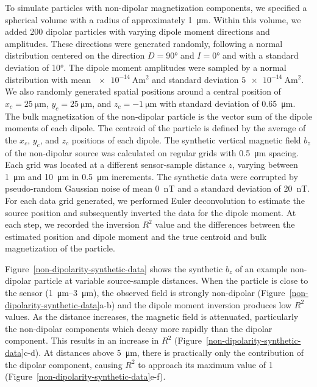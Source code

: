 To simulate particles with non-dipolar magnetization components, we specified a spherical volume with a radius of approximately \qty{1}{\um}. 
Within this volume, we added 200 dipolar particles with varying dipole moment directions and amplitudes. 
These directions were generated randomly, following a normal distribution centered on the direction $D=\ang{90}$ and $I=\ang{0}$ and with a standard deviation of \ang{10}.
The dipole moment amplitudes were sampled by a normal distribution with mean $\qty{e-14}{\ampere\m\squared}$ and standard deviation $\qty{5e-14}{\ampere\m\squared}$. 
We also randomly generated spatial positions around a central position of $x_c=\qty{25}{\um}$, $y_c=\qty{25}{\um}$, and $z_c=\qty{-1}{\um}$ with standard deviation of \qty{0.65}{\um}.
The bulk magnetization of the non-dipolar particle is the vector sum of the dipole moments of each dipole. 
The centroid of the particle is defined by the average of the $x_c$, $y_c$, and $z_c$ positions of each dipole.
The synthetic vertical magnetic field $b_z$ of the non-dipolar source was calculated on regular grids with \qty{0.5}{\um} spacing.
Each grid was located at a different sensor-sample distance $z$, varying between \qty{1}{\um} and \qty{10}{\um} in \qty{0.5}{\um} increments. 
The synthetic data were corrupted by pseudo-random Gaussian noise of mean \qty{0}{\nano\tesla} and a standard deviation of \qty{20}{\nano\tesla}.
For each data grid generated, we performed Euler deconvolution to estimate the source position and subsequently inverted the data for the dipole moment.
At each step, we recorded the inversion $R^2$ value and the differences between the estimated position and dipole moment and the true centroid and bulk magnetization of the particle.

Figure~\ref{non-dipolarity-synthetic-data} shows the synthetic $b_z$ of an example non-dipolar particle at variable source-sample distances.
When the particle is close to the sensor (\qtyrange{1}{3}{\um}), the observed field is strongly non-dipolar (Figure~\ref{non-dipolarity-synthetic-data}a-b) and the dipole moment inversion produces low $R^2$ values. 
As the distance increases, the magnetic field is attenuated, particularly the non-dipolar components which decay more rapidly than the dipolar component.
This results in an increase in $R^2$ (Figure~\ref{non-dipolarity-synthetic-data}c-d). 
At distances above \qty{5}{\um}, there is practically only the contribution of the dipolar component, causing $R^2$ to approach its maximum value of 1 (Figure~\ref{non-dipolarity-synthetic-data}e-f).

